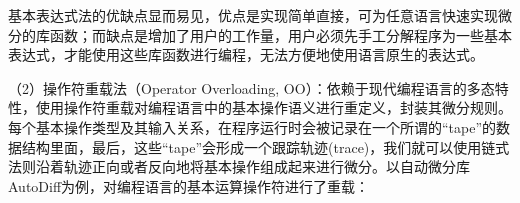\documentclass[letterpaper,10pt,english]{sphinxmanual}
\begin{document}
\begin{sphinxVerbatim}[commandchars=\\\{\}]
      
        
        

      
        
                
\end{sphinxVerbatim}

\sphinxAtStartPar
基本表达式法的优缺点显而易见，优点是实现简单直接，可为任意语言快速实现微分的库函数；而缺点是增加了用户的工作量，用户必须先手工分解程序为一些基本表达式，才能使用这些库函数进行编程，无法方便地使用语言原生的表达式。

\sphinxAtStartPar
（2）操作符重载法（Operator Overloading,
OO）：依赖于现代编程语言的多态特性，使用操作符重载对编程语言中的基本操作语义进行重定义，封装其微分规则。每个基本操作类型及其输入关系，在程序运行时会被记录在一个所谓的“tape”的数据结构里面，最后，这些“tape”会形成一个跟踪轨迹(trace)，我们就可以使用链式法则沿着轨迹正向或者反向地将基本操作组成起来进行微分。以自动微分库AutoDiff为例，对编程语言的基本运算操作符进行了重载：
\end{document}
